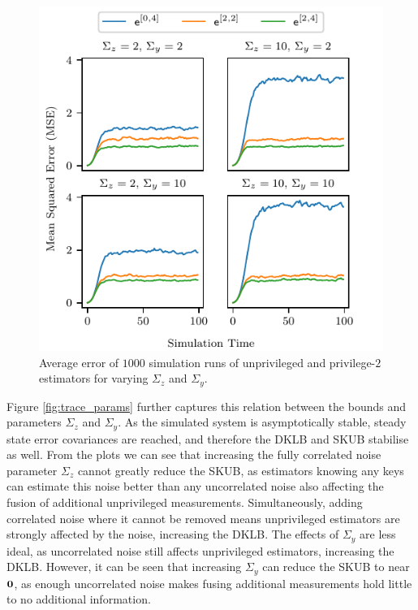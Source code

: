 \documentclass[conference]{IEEEtran}
\theoremstyle{definition}
\theoremstyle{remark}
\begin{document}
\begin{figure}[htbp]
  \centering
  \includegraphics{figures/mse_params.pdf}
  \caption{Average error of $1000$ simulation runs of unprivileged and privilege-$2$ estimators for varying $\Sigma_z$ and $\Sigma_y$.}
  \label{fig:mse_params}
\end{figure}
Figure \ref{fig:trace_params} further captures this relation between the bounds and parameters $\Sigma_z$ and $\Sigma_y$. As the simulated system is asymptotically stable, steady state error covariances are reached, and therefore the DKLB and SKUB stabilise as well. From the plots we can see that increasing the fully correlated noise parameter $\Sigma_z$ cannot greatly reduce the SKUB, as estimators knowing any keys can estimate this noise better than any uncorrelated noise also affecting the fusion of additional unprivileged measurements. Simultaneously, adding correlated noise where it cannot be removed means unprivileged estimators are strongly affected by the noise, increasing the DKLB. The effects of $\Sigma_y$ are less ideal, as uncorrelated noise still affects unprivileged estimators, increasing the DKLB. However, it can be seen that increasing $\Sigma_y$ can reduce the SKUB to near ${{\mathbf{0}}}$, as enough uncorrelated noise makes fusing additional measurements hold little to no additional information.
\end{document}
